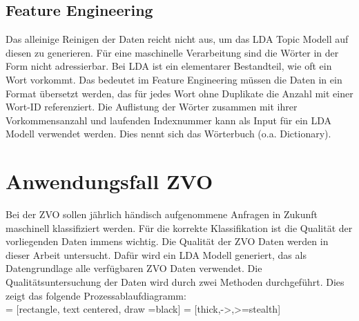 \documentclass[german,version-2020-11]{uzl-thesis}
\begin{document}
\subsection{Feature Engineering}
Das alleinige Reinigen der Daten reicht nicht aus, um das LDA Topic Modell auf diesen zu generieren. Für eine maschinelle Verarbeitung sind die Wörter in der Form nicht adressierbar. Bei LDA ist ein elementarer Bestandteil, wie oft ein Wort vorkommt. Das bedeutet im Feature Engineering müssen die Daten in ein Format übersetzt werden, das für jedes Wort ohne Duplikate die Anzahl mit einer Wort-ID referenziert. Die Auflistung der Wörter zusammen mit ihrer Vorkommensanzahl und laufenden Indexnummer kann als Input für ein LDA Modell verwendet werden. Dies nennt sich das Wörterbuch (o.a. Dictionary). 


\section{Anwendungsfall ZVO}
Bei der ZVO sollen jährlich händisch aufgenommene Anfragen in Zukunft maschinell klassifiziert werden. Für die korrekte Klassifikation ist die Qualität der vorliegenden Daten immens wichtig. Die Qualität der ZVO Daten werden in dieser Arbeit untersucht. Dafür wird ein LDA Modell generiert, das als Datengrundlage alle verfügbaren ZVO Daten verwendet. Die Qualitätsuntersuchung der Daten wird durch zwei Methoden durchgeführt. Dies zeigt das folgende Prozessablaufdiagramm:  \\

 = [rectangle, text centered, draw =black]
 = [thick,->,>=stealth]

\begin{center}
\end{center}\\
\\
\end{document}
